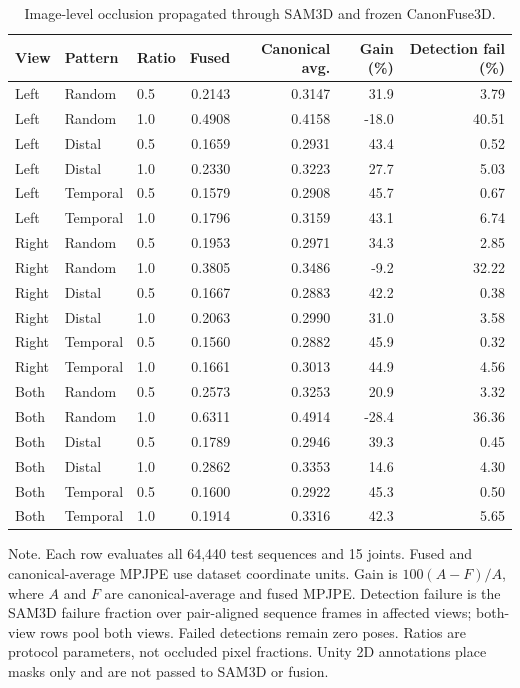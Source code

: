 \documentclass[preprint,12pt]{elsarticle}
\renewcommand{\textit}[1]{\textup{#1}}
\begin{document}
\begin{table}[t]
\centering
\caption{Image-level occlusion propagated through SAM3D and frozen CanonFuse3D.}
\label{tab:image_occlusion}
\footnotesize
\setlength{\tabcolsep}{5pt}
\begin{tabular}{lllrrrr}
\toprule
View & Pattern & Ratio & Fused & Canonical avg. & Gain (\%) & Detection fail (\%) \\
\midrule
Left & Random & 0.5 & 0.2143 & 0.3147 & 31.9 & 3.79 \\
Left & Random & 1.0 & 0.4908 & 0.4158 & -18.0 & 40.51 \\
Left & Distal & 0.5 & 0.1659 & 0.2931 & 43.4 & 0.52 \\
Left & Distal & 1.0 & 0.2330 & 0.3223 & 27.7 & 5.03 \\
Left & Temporal & 0.5 & 0.1579 & 0.2908 & 45.7 & 0.67 \\
Left & Temporal & 1.0 & 0.1796 & 0.3159 & 43.1 & 6.74 \\
Right & Random & 0.5 & 0.1953 & 0.2971 & 34.3 & 2.85 \\
Right & Random & 1.0 & 0.3805 & 0.3486 & -9.2 & 32.22 \\
Right & Distal & 0.5 & 0.1667 & 0.2883 & 42.2 & 0.38 \\
Right & Distal & 1.0 & 0.2063 & 0.2990 & 31.0 & 3.58 \\
Right & Temporal & 0.5 & 0.1560 & 0.2882 & 45.9 & 0.32 \\
Right & Temporal & 1.0 & 0.1661 & 0.3013 & 44.9 & 4.56 \\
Both & Random & 0.5 & 0.2573 & 0.3253 & 20.9 & 3.32 \\
Both & Random & 1.0 & 0.6311 & 0.4914 & -28.4 & 36.36 \\
Both & Distal & 0.5 & 0.1789 & 0.2946 & 39.3 & 0.45 \\
Both & Distal & 1.0 & 0.2862 & 0.3353 & 14.6 & 4.30 \\
Both & Temporal & 0.5 & 0.1600 & 0.2922 & 45.3 & 0.50 \\
Both & Temporal & 1.0 & 0.1914 & 0.3316 & 42.3 & 5.65 \\
\bottomrule
\end{tabular}
\vspace{0.3em}
\parbox{0.96\textwidth}{\footnotesize \textit{Note.} Each row evaluates all 64,440 test sequences and 15 joints. Fused and canonical-average MPJPE use dataset coordinate units. Gain is $100(A-F)/A$, where $A$ and $F$ are canonical-average and fused MPJPE. Detection failure is the SAM3D failure fraction over pair-aligned sequence frames in affected views; both-view rows pool both views. Failed detections remain zero poses. Ratios are protocol parameters, not occluded pixel fractions. Unity 2D annotations place masks only and are not passed to SAM3D or fusion.}
\end{table}
\end{document}
